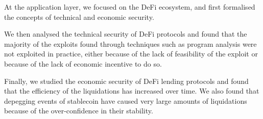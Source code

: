 At the application layer, we focused on the DeFi ecosystem, and first formalised the concepts of technical and economic security.

We then analysed the technical security of DeFi protocols and found that the majority of the exploits found through techniques such as program analysis were not exploited in practice, either because of the lack of feasibility of the exploit or because of the lack of economic incentive to do so.

Finally, we studied the economic security of DeFi lending protocols and found that the efficiency of the liquidations has increased over time.
We also found that depegging events of stablecoin have caused very large amounts of liquidations because of the over-confidence in their stability.
